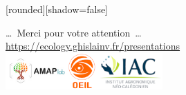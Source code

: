 \documentclass[10pt,table,dvipsnames,compress]{beamer}
\begin{document}
{
  [rounded][shadow=false]
  \begin{frame}[plain]
    \begin{block}{}
      \begin{center}
        \ldots~Merci pour votre attention~\ldots \\
        \url{https://ecology.ghislainv.fr/presentations} \\
        \includegraphics[width=0.45\textwidth]{figs/partners_logos}
      \end{center}
    \end{block}
  \end{frame}
}
\end{document}

